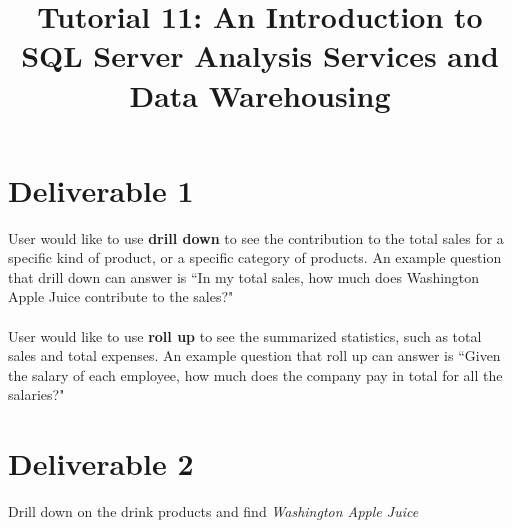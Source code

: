\documentclass{article}
\title{Tutorial 11: An Introduction to SQL Server Analysis Services and Data Warehousing}
\begin{document}
	\maketitle

\section{Deliverable 1}

User would like to use \textbf{drill down} to see the contribution to the total sales for a specific kind of product, or a specific category of products. An example question that drill down can answer is ``In my total sales, how much does Washington Apple Juice contribute to the sales?"\\
\\
User would like to use \textbf{roll up} to see the summarized statistics, such as total sales and total expenses. An example question that roll up can answer is ``Given the salary of each employee, how much does the company pay in total for all the salaries?"

\section{Deliverable 2}

Drill down on the drink products and find \textit{Washington Apple Juice}
\end{document}
